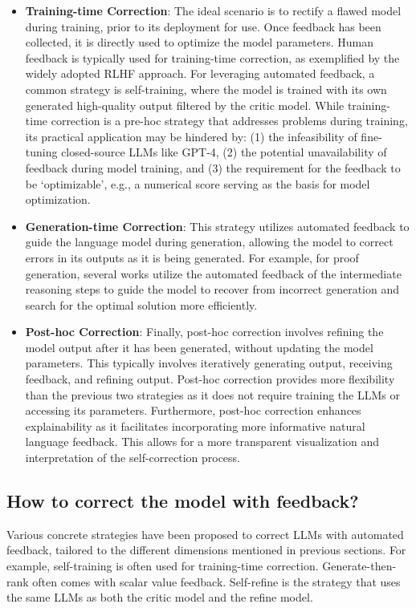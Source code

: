 \documentclass[a4paper,oneside]{book}
\begin{document}
\begin{itemize}
  \item \textbf{Training-time Correction}: The ideal scenario is to rectify a flawed model during training, prior to its deployment for use. Once feedback has been collected, it is directly used to optimize the model parameters. Human feedback is typically used for training-time correction, as exemplified by the widely adopted RLHF approach. For leveraging automated feedback, a common strategy is self-training, where the model is trained with its own generated high-quality output filtered by the critic model. While training-time correction is a pre-hoc strategy that addresses problems during training, its practical application may be hindered by: (1) the infeasibility of fine-tuning closed-source LLMs like GPT-4, (2) the potential unavailability of feedback during model training, and (3) the requirement for the feedback to be `optimizable', e.g., a numerical score serving as the basis for model optimization.

  \item \textbf{Generation-time Correction}: This strategy utilizes automated feedback to guide the language model during generation, allowing the model to correct errors in its outputs as it is being generated. For example, for proof generation, several works utilize the automated feedback of the intermediate reasoning steps to guide the model to recover from incorrect generation and search for the optimal solution more efficiently.

  \item \textbf{Post-hoc Correction}: Finally, post-hoc correction involves refining the model output after it has been generated, without updating the model parameters. This typically involves iteratively generating output, receiving feedback, and refining output. Post-hoc correction provides more flexibility than the previous two strategies as it does not require training the LLMs or accessing its parameters. Furthermore, post-hoc correction enhances explainability as it facilitates incorporating more informative natural language feedback. This allows for a more transparent visualization and interpretation of the self-correction process.
\end{itemize}

\subsection{How to correct the model with feedback?}
Various concrete strategies have been proposed to correct LLMs with automated feedback, tailored to the different dimensions mentioned in previous sections. For example, self-training is often used for training-time correction. Generate-then-rank often comes with scalar value feedback. Self-refine is the strategy that uses the same LLMs as both the critic model and the refine model.
\end{document}
